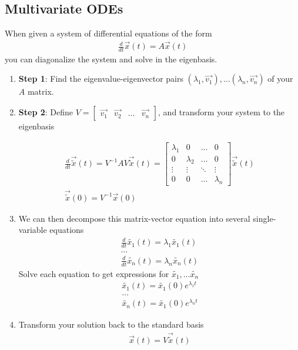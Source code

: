 \subsection*{Multivariate ODEs}
When given a system of differential equations of the form
\begin{align*}
    \frac{d}{dt} \vec{x}(t) = 
    A \vec{x}(t)
\end{align*}
you can diagonalize the system and solve in the eigenbasis.

\begin{enumerate}
    \item \textbf{Step 1}: Find the eigenvalue-eigenvector pairs $(\lambda_1, \vec{v_1}), \dots (\lambda_n, \vec{v_n})$ of your $A$ matrix.
    \item \textbf{Step 2}: Define $V = \begin{bmatrix}
        \vec{v_1} & \vec{v_2} & \dots & \vec{v_n}
    \end{bmatrix}$, and transform your system to the eigenbasis

    \begin{align*}
    \frac{d}{dt} \vec{\widetilde{x}}(t) =  V^{-1}AV \vec{\widetilde{x}}(t) =
    \begin{bmatrix}
        \lambda_1 & 0 & \dots & 0 \\
        0 & \lambda_2 & \dots & 0 \\
        \vdots & \vdots & \ddots & \vdots \\
        0 & 0 & \dots & \lambda_n
    \end{bmatrix} \vec{\widetilde{x}}(t) \\
    \vec{\widetilde{x}}(0) = V^{-1} \vec{x}(0)
    \end{align*}

    \item We can then decompose this matrix-vector equation into several single-variable equations
    \begin{align*}
        \frac{d}{dt} \widetilde{x_1}(t) = \lambda_1 \widetilde{x_1}(t) \\
        \dots \\
        \frac{d}{dt} \widetilde{x_n}(t) = \lambda_n \widetilde{x_n}(t)
    \end{align*}
    Solve each equation to get expressions for $\widetilde{x_1}, \dots \widetilde{x_n}$
    \begin{align*}
        \widetilde{x_1}(t) = \widetilde{x_1}(0) e^{\lambda_1 t} \\
        \dots \\
        \widetilde{x_n}(t) = \widetilde{x_1}(0) e^{\lambda_n t} 
    \end{align*}

    \item Transform your solution back to the standard basis
    \begin{align*}
        \vec{x}(t) = V \vec{\widetilde{x}}(t)
    \end{align*}

\end{enumerate}

